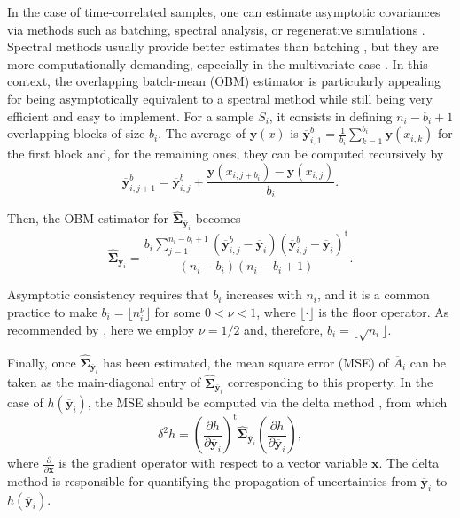 \documentclass[
    journal=jctcce,
    layout=twocolumn
]{achemso}
\newcommand{\mt}[1]{\boldsymbol{\mathbf{#1}}}   %
\newcommand{\vt}[1]{\boldsymbol{\mathbf{#1}}}   %
\newcommand{\tr}[1]{#1^\text{t}}                %
\newcommand{\diff}[2]{\frac{\partial #2}{\partial #1}} %
\newcommand{\avg}[1]{\overline{#1}}             %
\begin{document}
In the case of time-correlated samples, one can estimate asymptotic covariances via methods such as batching, spectral analysis, or regenerative simulations \cite{Geyer_1992, Alexopoulos_2006, Flegal_2010, Vats_2015, *Vats_2018}. Spectral methods usually provide better estimates than batching \cite{Flegal_2010}, but they are more computationally demanding, especially in the multivariate case \cite{Vats_2015, *Vats_2018}. In this context, the overlapping batch-mean (OBM) estimator \cite{Meketon_1984} is particularly appealing for being asymptotically equivalent to a spectral method while still being very efficient and easy to implement. For a sample $S_i$, it consists in defining $n_i-b_i+1$ overlapping blocks of size $b_i$. The average of $\vt y(x)$ is ${\avg{\vt y}}^b_{i,1} = \frac{1}{b_i} \sum_{k=1}^{b_i} \vt y(x_{i,k})$ for the first block and, for the remaining ones, they can be computed recursively by
\begin{equation*}
{\avg{\vt y}}^b_{i,j+1} = {\avg{\vt y}}^b_{i,j} + \frac{\vt y(x_{i,j+b_i}) - \vt y(x_{i,j})}{b_i}.
\end{equation*}

Then, the OBM estimator for $\hat{\mt \Sigma}_{\avg{\vt y}_i}$ becomes \cite{Meketon_1984}
\begin{equation}
\label{eq:obm asymptotic covariance}
\hat{\mt \Sigma}_{\avg{\vt y}_i} = \frac{b_i \sum\limits_{j=1}^{n_i - b_i + 1} ({\avg{\vt y}}^b_{i,j} - \avg{\vt y}_i) \tr{({\avg{\vt y}}^b_{i,j} - \avg{\vt y}_i)}}{(n_i - b_i)(n_i - b_i + 1)}.
\end{equation}

Asymptotic consistency requires that $b_i$ increases with $n_i$, and it is a common practice to make $b_i = \lfloor n_i^\nu \rfloor$ for some $0 < \nu < 1$, where $\lfloor \cdot \rfloor$ is the floor operator. As recommended by \citeauthor{Flegal_2010} \cite{Flegal_2010}, here we employ $\nu = 1/2$ and, therefore, $b_i = \lfloor \sqrt{n_i} \rfloor$.

Finally, once $\hat{\mt \Sigma}_{\avg{\vt y}_i}$ has been estimated, the mean square error (MSE) of $\avg A_i$ can be taken as the main-diagonal entry of $\hat{\mt \Sigma}_{\avg{\vt y}_i}$ corresponding to this property. In the case of $h(\avg{\vt y}_i)$, the MSE should be computed via the delta method \cite{Greene_2012}, from which
\begin{equation}
\label{eq:delta method}
\delta^2 h = \tr{\left(\diff{\avg{\vt y}_i} h\right)} \hat{\mt \Sigma}_{\avg{\vt y}_i}\left(\diff{\avg{\vt y}_i} h\right),
\end{equation}
where $\diff{\vt x}{}$ is the gradient operator with respect to a vector variable $\vt x$. The delta method is responsible for quantifying the propagation of uncertainties from $\avg{\vt y}_i$ to $h(\avg{\vt y}_i)$.
\end{document}
